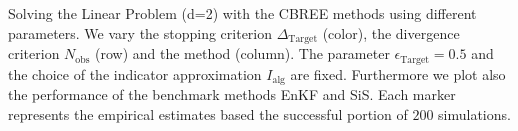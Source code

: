 Solving the Linear Problem (d=2) with the CBREE methods using      different parameters.     We vary the stopping criterion $\Delta_{\text{Target}}$ (color),     the divergence criterion $N_\text{obs}$ (row) and     the method  (column).     The parameter $\epsilon_{\text{Target}} = 0.5$     and the choice of the indicator approximation $I_\text{alg}$     are fixed.     Furthermore we plot also the performance of the benchmark methods EnKF     and SiS.     Each marker represents the empirical estimates based the successful portion of $200$ simulations.